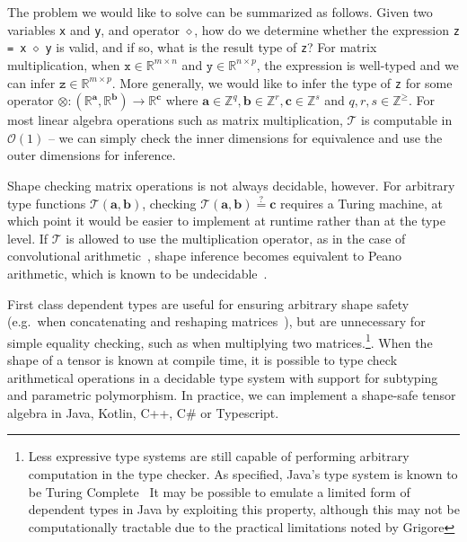 \documentclass[12pt,initial,twoside,maitrise]{dms}
\numberwithin{equation}{section}
\numberwithin{table}{chapter}
\numberwithin{figure}{chapter}
\begin{document}
The problem we would like to solve can be summarized as follows. Given two variables \texttt{x} and \texttt{y}, and operator $\diamond$, how do we determine whether the expression \texttt{z = x} $\diamond$ \texttt{y} is valid, and if so, what is the result type of \texttt{z}? For matrix multiplication, when $\texttt{x} \in \mathbb{R}^{m \times n}$ and $\texttt{y} \in \mathbb{R}^{n \times p}$, the expression is well-typed and we can infer $\texttt{z} \in \mathbb{R}^{m \times p}$. More generally, we would like to infer the type of \texttt{z} for some operator $\otimes: (\mathbb{R}^\mathbf{a}, \mathbb{R}^\mathbf{b}) \rightarrow \mathbb{R}^\mathbf{c}$ where $\mathbf{a} \in \mathbb{Z}^q, \mathbf{b} \in \mathbb{Z}^r, \mathbf{c} \in \mathbb{Z}^s$ and $q, r, s \in \mathbb{Z}^\geq$. For most linear algebra operations such as matrix multiplication, $\mathcal{T}$ is computable in $\mathcal{O}(1)$ -- we can simply check the inner dimensions for equivalence and use the outer dimensions for inference.

Shape checking matrix operations is not always decidable, however. For arbitrary type functions $\mathcal{T}(\mathbf{a}, \mathbf{b})$, checking $\mathcal{T}(\mathbf{a}, \mathbf{b}) \stackrel{?}{=} \mathbf{c}$ requires a Turing machine, at which point it would be easier to implement at runtime rather than at the type level. If $\mathcal{T}$ is allowed to use the multiplication operator, as in the case of convolutional arithmetic~\cite{dumoulin2016guide}, shape inference becomes equivalent to Peano arithmetic, which is known to be undecidable~\cite{godel1931formal}.

First class dependent types are useful for ensuring arbitrary shape safety (e.g.\ when concatenating and reshaping matrices~\cite{xi1998eliminating}), but are unnecessary for simple equality checking, such as when multiplying two matrices.\footnote{Less expressive type systems are still capable of performing arbitrary computation in the type checker. As specified, Java's type system is known to be Turing Complete~\cite{Grigore:2017:JGT:3009837.3009871} It may be possible to emulate a limited form of dependent types in Java by exploiting this property, although this may not be computationally tractable due to the practical limitations noted by Grigore}. When the shape of a tensor is known at compile time, it is possible to type check arithmetical operations in a decidable type system with support for subtyping and parametric polymorphism. In practice, we can implement a shape-safe tensor algebra in Java, Kotlin, C++, C\# or Typescript.
\end{document}
